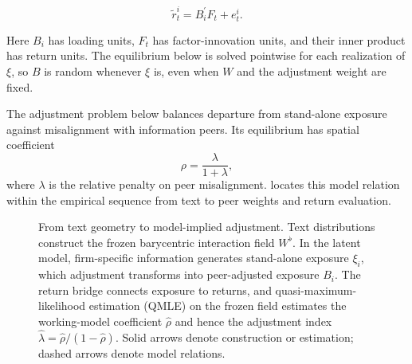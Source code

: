 \begin{equation}\label{eq:hilbert-return}
  \widetilde r_t^i = B_i^{\prime}F_t+e_t^i.
\end{equation}

Here $B_i$ has loading units, $F_t$ has factor-innovation units, and their inner
product has return units.
The equilibrium below is solved pointwise for each realization of $\xi$, so $B$
is random whenever $\xi$ is, even when $W$ and the adjustment weight are fixed.

The adjustment problem below balances departure from stand-alone exposure
against misalignment with information peers.
Its equilibrium has spatial coefficient
\[
  \rho=\frac{\lambda}{1+\lambda},
\]
where $\lambda$ is the relative penalty on peer misalignment.
 locates this model relation within the empirical
sequence from text to peer weights and return evaluation.

\begin{figure}[htbp]
  \centering
  \caption{From text geometry to model-implied adjustment. Text distributions
    construct the frozen barycentric interaction field $W^\flat$. In the latent
    model, firm-specific information generates stand-alone exposure $\xi_i$,
    which adjustment transforms into peer-adjusted exposure $B_i$. The return
    bridge connects exposure to returns, and quasi-maximum-likelihood
    estimation (QMLE) on the frozen field estimates the working-model
    coefficient $\hat\rho$ and hence the adjustment index
    $\hat\lambda=\hat\rho/(1-\hat\rho)$. Solid
    arrows denote construction or estimation;
  dashed arrows denote model relations.}
  \label{fig:spatial-exposure-arc}
\end{figure}
